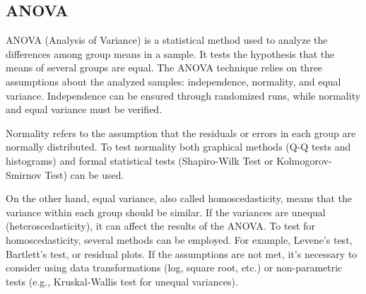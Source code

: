 \subsection{ANOVA} 

ANOVA (Analysis of Variance) is a statistical method used to analyze the differences among group means in a sample. It tests the hypothesis that the means of several groups are equal. The ANOVA technique relies on three assumptions about the analyzed samples: independence, normality, and equal variance. Independence can be ensured through randomized runs, while normality and equal variance must be verified.

Normality refers to the assumption that the residuals or errors in each group are normally distributed. To test normality both graphical methods (Q-Q tests and histograms) and formal statistical tests (Shapiro-Wilk Test or Kolmogorov-Smirnov Test) can be used. 

On the other hand, equal variance, also called homoscedasticity, means that the variance within each group should be similar. If the variances are unequal (heteroscedasticity), it can affect the results of the ANOVA. To test for homoscedasticity, several methods can be employed. For example,  Levene’s test, Bartlett’s test, or residual plots. If the assumptions are not met, it's necessary  to consider using data transformations (log, square root, etc.) or non-parametric tests (e.g., Kruskal-Wallis test for unequal variances).


